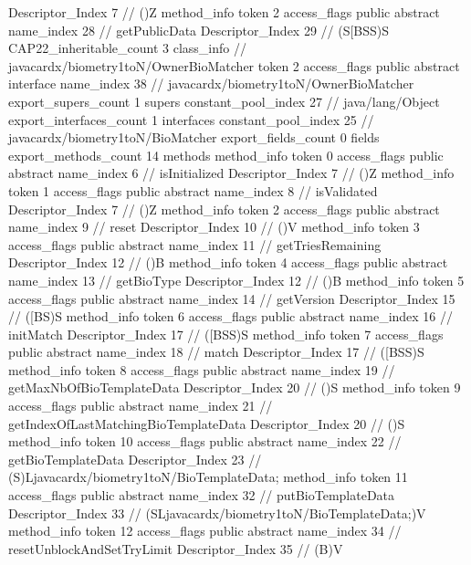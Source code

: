 {{{{{					Descriptor_Index	7		// ()Z
				}
				method_info {
					token	2
					access_flags	public abstract
					name_index	28		// getPublicData
					Descriptor_Index	29		// (S[BSS)S
				}
			}
			CAP22_inheritable_count	3
		}
		class_info {		// javacardx/biometry1toN/OwnerBioMatcher
			token	2
			access_flags	public abstract interface
			name_index	38		// javacardx/biometry1toN/OwnerBioMatcher
			export_supers_count	1
			supers {
				constant_pool_index	27		// java/lang/Object
			}
			export_interfaces_count	1
			interfaces {
				constant_pool_index	25		// javacardx/biometry1toN/BioMatcher
			}
			export_fields_count	0
			fields {
			}
			export_methods_count	14
			methods {
				method_info {
					token	0
					access_flags	public abstract
					name_index	6		// isInitialized
					Descriptor_Index	7		// ()Z
				}
				method_info {
					token	1
					access_flags	public abstract
					name_index	8		// isValidated
					Descriptor_Index	7		// ()Z
				}
				method_info {
					token	2
					access_flags	public abstract
					name_index	9		// reset
					Descriptor_Index	10		// ()V
				}
				method_info {
					token	3
					access_flags	public abstract
					name_index	11		// getTriesRemaining
					Descriptor_Index	12		// ()B
				}
				method_info {
					token	4
					access_flags	public abstract
					name_index	13		// getBioType
					Descriptor_Index	12		// ()B
				}
				method_info {
					token	5
					access_flags	public abstract
					name_index	14		// getVersion
					Descriptor_Index	15		// ([BS)S
				}
				method_info {
					token	6
					access_flags	public abstract
					name_index	16		// initMatch
					Descriptor_Index	17		// ([BSS)S
				}
				method_info {
					token	7
					access_flags	public abstract
					name_index	18		// match
					Descriptor_Index	17		// ([BSS)S
				}
				method_info {
					token	8
					access_flags	public abstract
					name_index	19		// getMaxNbOfBioTemplateData
					Descriptor_Index	20		// ()S
				}
				method_info {
					token	9
					access_flags	public abstract
					name_index	21		// getIndexOfLastMatchingBioTemplateData
					Descriptor_Index	20		// ()S
				}
				method_info {
					token	10
					access_flags	public abstract
					name_index	22		// getBioTemplateData
					Descriptor_Index	23		// (S)Ljavacardx/biometry1toN/BioTemplateData;
				}
				method_info {
					token	11
					access_flags	public abstract
					name_index	32		// putBioTemplateData
					Descriptor_Index	33		// (SLjavacardx/biometry1toN/BioTemplateData;)V
				}
				method_info {
					token	12
					access_flags	public abstract
					name_index	34		// resetUnblockAndSetTryLimit
					Descriptor_Index	35		// (B)V
}}}}}
